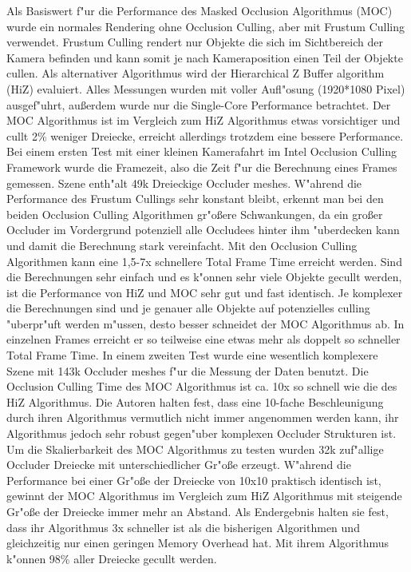 \documentclass[journal]{vgtc}
\begin{document}
Als Basiswert f"ur die Performance des Masked Occlusion Algorithmus (MOC) wurde ein normales Rendering ohne Occlusion Culling, aber mit Frustum Culling verwendet.
Frustum Culling rendert nur Objekte die sich im Sichtbereich der Kamera befinden und kann somit je nach Kameraposition einen Teil der Objekte cullen.
Als alternativer Algorithmus wird der \glqq Hierarchical Z Buffer algorithm \grqq{} (HiZ) evaluiert.
Alles Messungen wurden mit voller Aufl"osung (1920*1080 Pixel) ausgef"uhrt, au\ss{}erdem wurde nur die Single-Core Performance betrachtet.
Der MOC Algorithmus ist im Vergleich zum HiZ Algorithmus etwas vorsichtiger und cullt 2\% weniger Dreiecke, erreicht allerdings trotzdem eine bessere Performance.
Bei einem ersten Test mit einer kleinen Kamerafahrt im Intel Occlusion Culling Framework wurde die Framezeit, also die Zeit f"ur die Berechnung eines Frames gemessen.
Szene enth"alt 49k Dreieckige Occluder meshes.
W"ahrend die Performance des Frustum Cullings sehr konstant bleibt, erkennt man bei den beiden Occlusion Culling Algorithmen gr"o\ss{}ere Schwankungen, da ein gro\ss{}er Occluder im Vordergrund potenziell alle Occludees hinter ihm "uberdecken kann und damit die Berechnung stark vereinfacht.
Mit den Occlusion Culling Algorithmen kann eine 1,5-7x schnellere Total Frame Time erreicht werden.
Sind die Berechnungen sehr einfach und es k"onnen sehr viele Objekte gecullt werden, ist die Performance von HiZ und MOC sehr gut und fast identisch.
Je komplexer die Berechnungen sind und je genauer alle Objekte auf potenzielles culling "uberpr"uft werden m"ussen, desto besser schneidet der MOC Algorithmus ab.
In einzelnen Frames erreicht er so teilweise eine etwas mehr als doppelt so schneller Total Frame Time.
In einem zweiten Test wurde eine wesentlich komplexere Szene mit 143k Occluder meshes f"ur die Messung der Daten benutzt.
Die Occlusion Culling Time des MOC Algorithmus ist ca. 10x so schnell wie die des HiZ Algorithmus.
Die Autoren halten fest, dass eine 10-fache Beschleunigung durch ihren Algorithmus vermutlich nicht immer angenommen werden kann, ihr Algorithmus jedoch sehr robust gegen"uber komplexen Occluder Strukturen ist.
Um die Skalierbarkeit des MOC Algorithmus zu testen wurden 32k zuf"allige Occluder Dreiecke mit unterschiedlicher Gr"o\ss{}e erzeugt.
W"ahrend die Performance bei einer Gr"o\ss{}e der Dreiecke von 10x10 praktisch identisch ist, gewinnt der MOC Algorithmus im Vergleich zum HiZ Algorithmus mit steigende Gr"o\ss{}e der Dreiecke immer mehr an Abstand.
Als Endergebnis halten sie fest, dass ihr Algorithmus 3x schneller ist als die bisherigen Algorithmen und gleichzeitig nur einen geringen Memory Overhead hat.
Mit ihrem Algorithmus k"onnen 98\% aller Dreiecke gecullt werden. 
\end{document}
